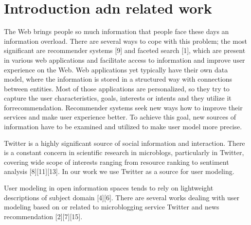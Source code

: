 \documentclass[a4, conference]{IEEEtran}
\begin{document}
\section{Introduction adn related work}
The Web brings people so much information that people face  these  days  an  information  overload.  There  are several ways  to  cope  with  this  problem;  the  most  significant  are recommender  systems  [9]  and  faceted  search  [1],  which  are present  in  various  web  applications  and  facilitate access  to information  and  improve  user  experience  on  the  Web. Web applications  yet  typically  have  their  own  data  model,  where the   information   is   stored   in   a   structured   way   with connections  between  entities.  Most  of  those  applications are personalized,  so  they  try  to  capture  the  user  characteristics, goals,    interests    or    intents    and    they    utilize    it    forrecommendation.  Recommender  systems  seek  new  ways how  to  improve  their  services  and  make  user  experience better. To achieve this goal, new sources of information have to  be  examined  and  utilized  to  make  user  model  more precise.~\cite{Abel2011,deBerg2000,Majer2012}

Twitter    is    a    highly    significant    source    of    social information  and  interaction.  There  is  a  constant  concern  in scientific  research  in  microblogs,  particularly  in Twitter, covering  wide  scope  of  interests  ranging  from  resource ranking  to  sentiment  analysis  [8][11][13].  In  our  work  we use Twitter as a source for user modeling.

User  modeling in open  information  spaces  tends  to  rely on  lightweight  descriptions  of  subject  domain  [4][6].  There are  several  works  dealing  with  user  modeling  based on  or related    to   microblogging    service    Twitter    and    news recommendation [2][7][15]. 
\end{document}
